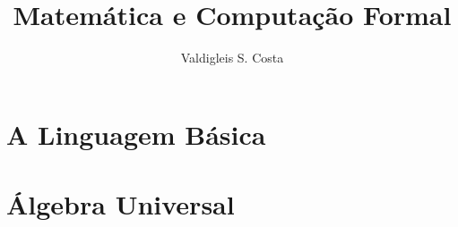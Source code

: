 \documentclass[b5paper,10pt]{book}
\title{Matemática e Computação Formal}
\author{Valdigleis S. Costa}
\begin{document}
	
	\frontmatter

	
		
	
	
	\tableofcontents
	
	\mainmatter
	
	\part{A Linguagem Básica}
		
	
	
	
	
	
	

	\part{Álgebra Universal}
	

\end{document}
